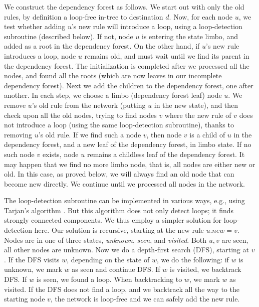 We construct the dependency forest as follows. We start out with only the old rules, by definition a loop-free in-tree to destination $d$. Now, for each node $u$, we test whether adding $u$'s new rule will introduce a loop, using a loop-detection subroutine (described below). If not, node $u$ is entering the state limbo, and added as a root in the dependency forest. On the other hand, if $u$'s new rule introduces a loop, node $u$ remains old, and must wait until we find its parent in the dependency forest. The initialization is completed after we processed all the nodes, and found all the roots (which are now leaves in our incomplete dependency forest). Next we add the children to the dependency forest, one after another. In each step, we choose a limbo (dependency forest leaf) node $u$. We remove $u$'s old rule from the network (putting $u$ in the new state), and then check upon all the old nodes, trying to find nodes $v$ where the new rule of $v$ does not introduce a loop (using the same loop-detection subroutine), thanks to removing $u$'s old rule. If we find such a node $v$, then node $v$ is a child of $u$ in the dependency forest, and a new leaf of the dependency forest, in limbo state. If no such node $v$ exists, node $u$ remains a childless leaf of the dependency forest. It may happen that we find no more limbo node, that is, all nodes are either new or old. In this case, as proved below, we will always find an old node that can become new directly.
We continue until we processed all nodes in the network.


The loop-detection subroutine can be implemented in various ways, e.g., using
Tarjan's algorithm \cite{tarjan72}. But this algorithm does not only detect loops; it finds strongly connected components. We thus employ a simpler solution for loop-detection here. Our solution is recursive, starting at the new rule $u.new = v$. Nodes are in one of three states, \emph{unknown}, \emph{seen}, and \emph{visited}. Both $u,v$ are seen, all other nodes are unknown. Now we do a depth-first search (DFS), starting at $v$. If the DFS visits $w$, depending on the state of $w$, we do the following: if $w$ is unknown, we mark $w$ as seen and continue DFS. If $w$ is visited, we backtrack DFS. If $w$ is seen, we found a loop. When backtracking to $w$, we mark $w$ as visited. If the DFS does not find a loop, and we backtrack all the way to the starting node $v$, the network is loop-free and we can safely add the new rule.


